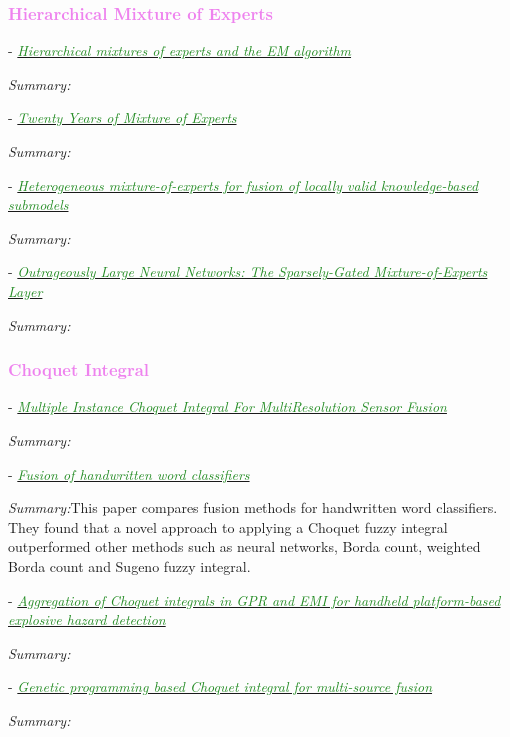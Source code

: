 \documentclass[]{article}
\newcommand{\paperentry}[4]{
            \hangindent=1cm
            \textcolor{red}{\cite{#1}} - \href{run:../References/#3}{\textcolor{ForestGreen}{\textit{#2}}}
            
            \noindent            
            \begin{minipage}[t]{0.1\linewidth}\hfill\end{minipage}
            \begin{minipage}[t]{0.8\linewidth}\textcolor{NavyBlue}{{\textit{Summary:}}}#4\end{minipage}
            \vspace{.25cm}
          }
\begin{document}
	
		\textcolor{Violet}{\subsubsection{Hierarchical Mixture of Experts}}
		
			\paperentry{Jordan1993HME}
			{Hierarchical mixtures of experts and the EM algorithm}
			{Fusion/HME/Jordan1993HME.pdf}
			{}
		
			\paperentry{Yuksel2012TwentyYearsMixtureofExperts}
			{Twenty Years of Mixture of Experts}
			{Fusion/HME/Yuksel2012TwentyYearsMixtureofExperts.pdf}
			{}
			
			\paperentry{Beyer2009HeterogeneousMixtureOfExperts}
			{Heterogeneous mixture-of-experts for fusion of locally valid knowledge-based submodels}
			{Fusion/HME/Beyer2009HeterogeneousMixtureOfExperts.pdf}
			{}
			
			\paperentry{Shazeer2017SparselyGatedMixtureOfExperts}
			{Outrageously Large Neural Networks: The Sparsely-Gated Mixture-of-Experts Layer}
			{Fusion/HME/Shazeer2017SparselyGatedMixtureOfExperts.pdf}
			{}
		
		
		\textcolor{Violet}{\subsubsection{Choquet Integral}}
		
			
		
			\paperentry{Du2017Thesis}
			{Multiple Instance Choquet Integral For MultiResolution Sensor Fusion}
			{Fusion/Du2017Thesis.pdf}
			{}
			
			\paperentry{Gader1996FusionHandwrittenLetters}
			{Fusion of handwritten word classifiers}
			{Fusion/Gader1996FusionHandwrittenLetters.pdf}
			{This paper compares fusion methods for handwritten word classifiers.  They found that a novel approach to applying a Choquet fuzzy integral outperformed other methods such as neural networks, Borda count, weighted Borda count and Sugeno fuzzy integral.}
		
			\paperentry{Smith2017ChoquetIntegralLandmine}
			{Aggregation of Choquet integrals in GPR and EMI for handheld platform-based explosive hazard detection}
			{Fusion/Choquet/Smith2017ChoquetIntegralLandmine.pdf}
			{}
			
			\paperentry{Smith2017GeneticProgrammingChoquetIntegral}
			{Genetic programming based Choquet integral for multi-source fusion}
			{Fusion/Choquet/Smith2017GeneticProgrammingChoquetIntegral.pdf}
			{}
		
\end{document}
